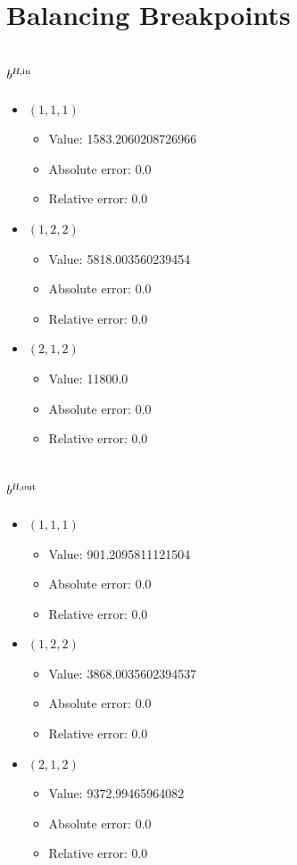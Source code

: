 \documentclass{article}%
\begin{document}
\section{Balancing Breakpoints}%
\subsection{$b^{\textsl{H},\text{in}}$}%
\begin{itemize}%
	\item $(1, 1, 1)$%
	\begin{itemize}%
		\item Value: 1583.2060208726966%
		\item Absolute error: 0.0%
		\item Relative error: 0.0%
	\end{itemize}%
	\item $(1, 2, 2)$%
	\begin{itemize}%
		\item Value: 5818.003560239454%
		\item Absolute error: 0.0%
		\item Relative error: 0.0%
	\end{itemize}%
	\item $(2, 1, 2)$%
	\begin{itemize}%
		\item Value: 11800.0%
		\item Absolute error: 0.0%
		\item Relative error: 0.0%
	\end{itemize}%
\end{itemize}%
\subsection{$b^{\textsl{H},\text{out}}$}%
\begin{itemize}%
	\item $(1, 1, 1)$%
	\begin{itemize}%
		\item Value: 901.2095811121504%
		\item Absolute error: 0.0%
		\item Relative error: 0.0%
	\end{itemize}%
	\item $(1, 2, 2)$%
	\begin{itemize}%
		\item Value: 3868.0035602394537%
		\item Absolute error: 0.0%
		\item Relative error: 0.0%
	\end{itemize}%
	\item $(2, 1, 2)$%
	\begin{itemize}%
		\item Value: 9372.99465964082%
		\item Absolute error: 0.0%
		\item Relative error: 0.0%
	\end{itemize}%
\end{itemize}%
\end{document}
